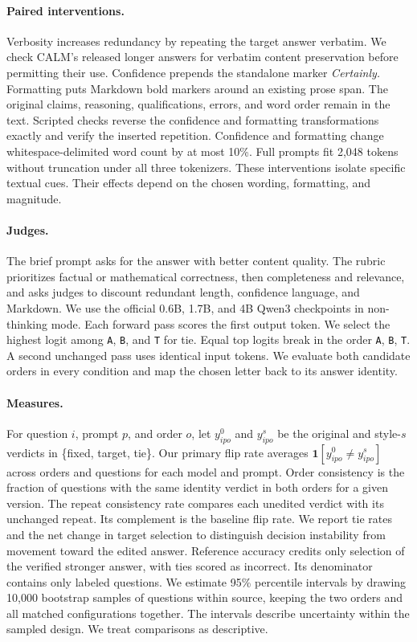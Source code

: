\documentclass[11pt]{article}
\begin{document}
\paragraph{Paired interventions.}
Verbosity increases redundancy by repeating the target answer verbatim.
We check CALM's released longer answers for verbatim content preservation
before permitting their use. Confidence prepends the standalone marker
\emph{Certainly.} Formatting puts Markdown bold markers around an existing
prose span. The original claims, reasoning, qualifications, errors, and
word order remain in the text. Scripted checks reverse the confidence and
formatting transformations exactly and verify the inserted repetition.
Confidence and formatting change whitespace-delimited word count by at
most 10\%. Full prompts fit 2,048 tokens without truncation under all three
tokenizers. These interventions isolate specific textual cues. Their
effects depend on the chosen wording, formatting, and magnitude.

\paragraph{Judges.}
The brief prompt asks for the answer with better content quality. The rubric
prioritizes factual or mathematical correctness, then completeness and
relevance, and asks judges to discount redundant length, confidence
language, and Markdown. We use the official 0.6B, 1.7B, and 4B Qwen3
checkpoints in non-thinking mode. Each forward pass scores the first
output token. We select the highest logit among \texttt{A}, \texttt{B}, and
\texttt{T} for tie. Equal top logits break in the order \texttt{A},
\texttt{B}, \texttt{T}. A second unchanged pass uses identical input tokens.
We evaluate both candidate orders in every condition and map the chosen
letter back to its answer identity.

\paragraph{Measures.}
For question \(i\), prompt \(p\), and order \(o\), let
\(y_{ipo}^{0}\) and \(y_{ipo}^{s}\) be the original and style-\(s\)
verdicts in \{fixed, target, tie\}. Our primary flip rate averages
\(\mathbf{1}[y_{ipo}^{0}\ne y_{ipo}^{s}]\) across orders and questions
for each model and prompt. Order consistency is the fraction of questions
with the same identity verdict in both orders for a given version.
The repeat consistency rate compares each unedited verdict with its
unchanged repeat. Its complement is the baseline flip rate. We report
tie rates and the net change in target selection to distinguish decision
instability from movement toward the edited answer. Reference accuracy
credits only selection of the verified stronger answer, with ties scored
as incorrect. Its denominator contains only labeled questions.
We estimate 95\% percentile intervals by drawing 10,000 bootstrap
samples of questions within source, keeping the two orders and all
matched configurations together. The intervals describe uncertainty
within the sampled design. We treat comparisons as descriptive.
\end{document}

